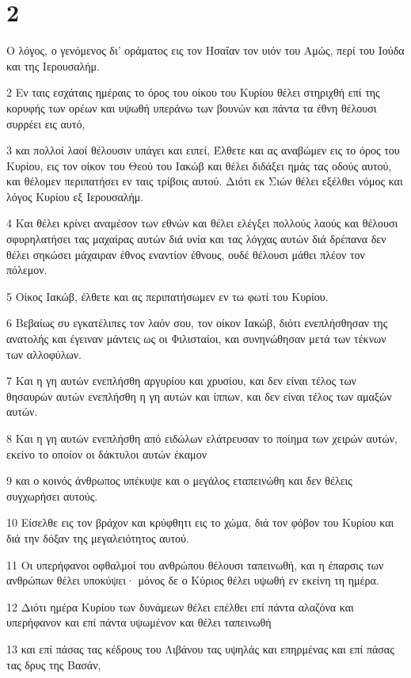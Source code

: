 \chapter{2}

\par Ο λόγος, ο γενόμενος δι' οράματος εις τον Ησαΐαν τον υιόν του Αμώς, περί του Ιούδα και της Ιερουσαλήμ.
\par 2 Εν ταις εσχάταις ημέραις το όρος του οίκου του Κυρίου θέλει στηριχθή επί της κορυφής των ορέων και υψωθή υπεράνω των βουνών και πάντα τα έθνη θέλουσι συρρέει εις αυτό,
\par 3 και πολλοί λαοί θέλουσιν υπάγει και ειπεί, Έλθετε και ας αναβώμεν εις το όρος του Κυρίου, εις τον οίκον του Θεού του Ιακώβ και θέλει διδάξει ημάς τας οδούς αυτού, και θέλομεν περιπατήσει εν ταις τρίβοις αυτού. Διότι εκ Σιών θέλει εξέλθει νόμος και λόγος Κυρίου εξ Ιερουσαλήμ.
\par 4 Και θέλει κρίνει αναμέσον των εθνών και θέλει ελέγξει πολλούς λαούς και θέλουσι σφυρηλατήσει τας μαχαίρας αυτών διά υνία και τας λόγχας αυτών διά δρέπανα δεν θέλει σηκώσει μάχαιραν έθνος εναντίον έθνους, ουδέ θέλουσι μάθει πλέον τον πόλεμον.
\par 5 Οίκος Ιακώβ, έλθετε και ας περιπατήσωμεν εν τω φωτί του Κυρίου.
\par 6 Βεβαίως συ εγκατέλιπες τον λαόν σου, τον οίκον Ιακώβ, διότι ενεπλήσθησαν της ανατολής και έγειναν μάντεις ως οι Φιλισταίοι, και συνηνώθησαν μετά των τέκνων των αλλοφύλων.
\par 7 Και η γη αυτών ενεπλήσθη αργυρίου και χρυσίου, και δεν είναι τέλος των θησαυρών αυτών ενεπλήσθη η γη αυτών και ίππων, και δεν είναι τέλος των αμαξών αυτών.
\par 8 Και η γη αυτών ενεπλήσθη από ειδώλων ελάτρευσαν το ποίημα των χειρών αυτών, εκείνο το οποίον οι δάκτυλοι αυτών έκαμον
\par 9 και ο κοινός άνθρωπος υπέκυψε και ο μεγάλος εταπεινώθη και δεν θέλεις συγχωρήσει αυτούς.
\par 10 Είσελθε εις τον βράχον και κρύφθητι εις το χώμα, διά τον φόβον του Κυρίου και διά την δόξαν της μεγαλειότητος αυτού.
\par 11 Οι υπερήφανοι οφθαλμοί του ανθρώπου θέλουσι ταπεινωθή, και η έπαρσις των ανθρώπων θέλει υποκύψει· μόνος δε ο Κύριος θέλει υψωθή εν εκείνη τη ημέρα.
\par 12 Διότι ημέρα Κυρίου των δυνάμεων θέλει επέλθει επί πάντα αλαζόνα και υπερήφανον και επί πάντα υψωμένον και θέλει ταπεινωθή
\par 13 και επί πάσας τας κέδρους του Λιβάνου τας υψηλάς και επηρμένας και επί πάσας τας δρυς της Βασάν,
